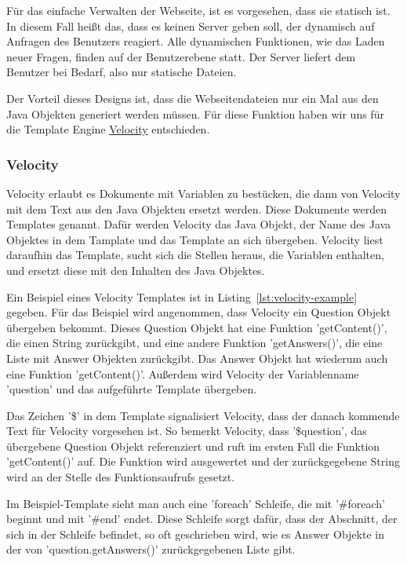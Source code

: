 \label{Sokol}
Für das einfache Verwalten der Webseite, ist es vorgesehen, dass sie statisch ist.
In diesem Fall heißt das, dass es keinen Server geben soll, der dynamisch auf Anfragen des Benutzers reagiert.
Alle dynamischen Funktionen, wie das Laden neuer Fragen, finden auf der Benutzerebene statt.
Der Server liefert dem Benutzer bei Bedarf, also nur statische Dateien.

Der Vorteil dieses Designs ist, dass die Webseitendateien nur ein Mal aus den Java Objekten generiert werden müssen.
Für diese Funktion haben wir uns für die Template Engine \href{http://velocity.apache.org/}{Velocity} entschieden.

\subsubsection{Velocity}

Velocity erlaubt es Dokumente mit Variablen zu bestücken, die dann von Velocity mit dem Text aus den Java Objekten ersetzt werden.
Diese Dokumente werden Templates genannt.
Dafür werden Velocity das Java Objekt, der Name des Java Objektes in dem Tamplate und das Template an sich übergeben.
Velocity liest daraufhin das Template, sucht sich die Stellen heraus, die Variablen enthalten, und ersetzt diese mit den Inhalten des Java Objektes.

Ein Beispiel eines Velocity Templates ist in Listing~\ref{lst:velocity-example} gegeben.
Für das Beispiel wird angenommen, dass Velocity ein Question Objekt übergeben bekommt.
Dieses Question Objekt hat eine Funktion 'getContent()', die einen String zurückgibt, und eine andere Funktion 'getAnswers()', die eine Liste mit Answer Objekten zurückgibt.
Das Answer Objekt hat wiederum auch eine Funktion 'getContent()'.
Außerdem wird Velocity der Variablenname 'question' und das aufgeführte Template übergeben.

Das Zeichen '\$' in dem Template signalisiert Velocity, dass der danach kommende Text für Velocity vorgesehen ist.
So bemerkt Velocity, dass '\$question', das übergebene Question Objekt referenziert und ruft im ersten Fall die Funktion 'getContent()' auf.
Die Funktion wird ausgewertet und der zurückgegebene String wird an der Stelle des Funktionsaufrufs gesetzt.

Im Beispiel-Template sieht man auch eine 'foreach' Schleife, die mit '\#foreach' beginnt und mit '\#end' endet.
Diese Schleife sorgt dafür, dass der Abschnitt, der sich in der Schleife befindet, so oft geschrieben wird, wie es Answer Objekte in der von 'question.getAnswers()' zurückgegebenen Liste gibt.

